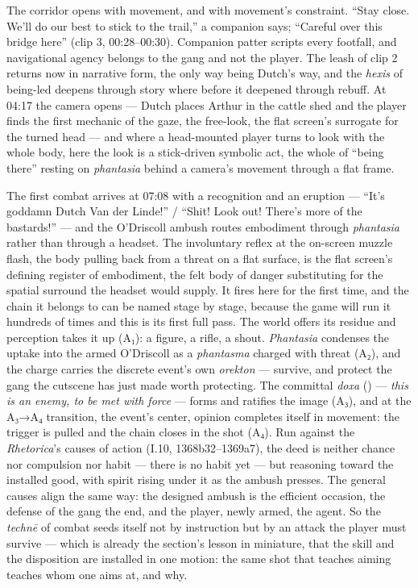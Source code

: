 The corridor opens with movement, and with movement's constraint. ``Stay close. We'll do our best to stick to the trail,'' a companion says; ``Careful over this bridge here'' (clip 3, 00:28–00:30). Companion patter scripts every footfall, and navigational agency belongs to the gang and not the player. The leash of clip 2 returns now in narrative form, the only way being Dutch's way, and the \textit{hexis} of being-led deepens through story where before it deepened through rebuff. At 04:17 the camera opens — Dutch places Arthur in the cattle shed and the player finds the first mechanic of the gaze, the free-look, the flat screen's surrogate for the turned head — and where a head-mounted player turns to look with the whole body, here the look is a stick-driven symbolic act, the whole of ``being there'' resting on \textit{phantasia} behind a camera's movement through a flat frame.

The first combat arrives at 07:08 with a recognition and an eruption — ``It's goddamn Dutch Van der Linde!'' / ``Shit! Look out! There's more of the bastards!'' — and the O'Driscoll ambush routes embodiment through \textit{phantasia} rather than through a headset. The involuntary reflex at the on-screen muzzle flash, the body pulling back from a threat on a flat surface, is the flat screen's defining register of embodiment, the felt body of danger substituting for the spatial surround the headset would supply. It fires here for the first time, and the chain it belongs to can be named stage by stage, because the game will run it hundreds of times and this is its first full pass. The world offers its residue and perception takes it up (A₁): a figure, a rifle, a shout. \textit{Phantasia} condenses the uptake into the armed O'Driscoll as a \textit{phantasma} charged with threat (A₂), and the charge carries the discrete event's own \textit{orekton} — survive, and protect the gang the cutscene has just made worth protecting. The committal \textit{doxa} () — \textit{this is an enemy, to be met with force} — forms and ratifies the image (A₃), and at the A₃→A₄ transition, the event's center, opinion completes itself in movement: the trigger is pulled and the chain closes in the shot (A₄). Run against the \textit{Rhetorica}'s causes of action (I.10, 1368b32--1369a7), the deed is neither chance nor compulsion nor habit — there is no habit yet — but reasoning toward the installed good, with spirit rising under it as the ambush presses. The general causes align the same way: the designed ambush is the efficient occasion, the defense of the gang the end, and the player, newly armed, the agent. So the \textit{technē} of combat seeds itself not by instruction but by an attack the player must survive — which is already the section's lesson in miniature, that the skill and the disposition are installed in one motion: the same shot that teaches aiming teaches whom one aims at, and why.

